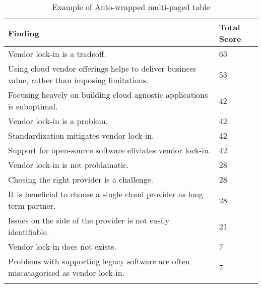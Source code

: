 
\renewcommand\arraystretch{1.5}%
\begin{longtable}{|p{10cm}|p{2cm}|}
\hline
\textbf{Finding}  & \textbf{Total Score} \\ \hline
\endhead
Vendor lock-in is a tradeoff. & 63 \\ \hline
Using cloud vendor offerings helps to deliver business value, rather than imposing limitations. & 53 \\ \hline
Focusing heavely on building cloud agnostic applications is suboptimal. & 42 \\ \hline
Vendor lock-in is a problem. & 42 \\ \hline
Standardization mitigates vendor lock-in. & 42 \\ \hline
Support for open-source software eliviates vendor lock-in. & 42 \\ \hline
Vendor lock-in is not problamatic. & 28 \\ \hline
Chosing the right provider is a challenge. & 28 \\ \hline
It is beneficial to choose a single cloud provider as long term partner. & 28 \\ \hline
Issues on the side of the provider is not easily identifiable. & 21 \\ \hline
Vendor lock-in does not exists. & 7 \\ \hline
Problems with supporting legacy software are often miscatagorised as vendor lock-in. & 7 \\ \hline
\caption{Example of Auto-wrapped multi-paged table}
\label{tab:table1}
\end{longtable}

